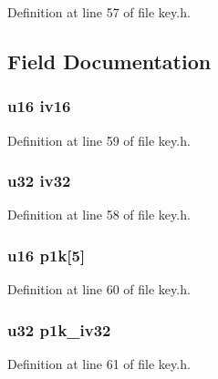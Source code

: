 Definition at line 57 of file key.\-h.



\subsection{Field Documentation}
\hypertarget{structtkip__ctx_aa895c0235826b5239fe3fc9e60234f7a}{
\subsubsection[{iv16}]{\setlength{\rightskip}{0pt plus 5cm}u16 iv16}}\label{structtkip__ctx_aa895c0235826b5239fe3fc9e60234f7a}


Definition at line 59 of file key.\-h.

\hypertarget{structtkip__ctx_a8dcfea175d62065bce779b4c72f7aeaf}{
\subsubsection[{iv32}]{\setlength{\rightskip}{0pt plus 5cm}u32 iv32}}\label{structtkip__ctx_a8dcfea175d62065bce779b4c72f7aeaf}


Definition at line 58 of file key.\-h.

\hypertarget{structtkip__ctx_abce48d931850e3d4a10223b34f9edf7b}{
\subsubsection[{p1k}]{\setlength{\rightskip}{0pt plus 5cm}u16 p1k\mbox{[}5\mbox{]}}}\label{structtkip__ctx_abce48d931850e3d4a10223b34f9edf7b}


Definition at line 60 of file key.\-h.

\hypertarget{structtkip__ctx_a8836e079a29312e72713be0756c36f7d}{
\subsubsection[{p1k\-\_\-iv32}]{\setlength{\rightskip}{0pt plus 5cm}u32 p1k\-\_\-iv32}}\label{structtkip__ctx_a8836e079a29312e72713be0756c36f7d}


Definition at line 61 of file key.\-h.


